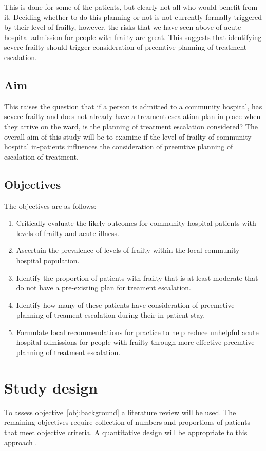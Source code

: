 \documentclass
[
	12pt,
	a4paper,
	oneside,
]{article}
\begin{document}
This is done for some of the patients, but clearly not all who would benefit from it. 
Deciding whether to do this planning or not is not currently formally triggered 
by their level of frailty, however, the risks that we have seen above of acute hospital 
admission for people with frailty are great. This suggests that identifying severe frailty 
should trigger consideration of preemtive planning of treatment escalation.

\subsection{Aim}
This raises the question that if a person is admitted to a community hospital, has 
severe frailty and does not already have a treament escalation plan in place when they 
arrive on the ward, is the planning of treatment escalation considered? The overall 
aim of this study will be to examine if the level of frailty of community hospital
in-patients influences the consideration of preemtive planning of escalation of 
treatment.

\subsection{Objectives}

The objectives are as follows:
\begin{enumerate}
\item	Critically evaluate the likely outcomes for community hospital patients 
		with levels of frailty and acute illness. \label{obj:background}
\item	Ascertain the prevalence of levels of frailty within the local community
		hospital population. \label{obj:prevalence}
\item	Identify the proportion of patients with frailty that is at least moderate
		that do not have a pre-existing plan for treament escalation. \label{obj:noplan}
\item	Identify how many of these patients have consideration of preemetive planning
		of treament escalation during their in-patient stay. \label{obj:association}
\item	Formulate local recommendations for practice to help reduce unhelpful
		acute hospital admissions for people with frailty through more effective
		preemtive planning of treatment escalation.
\end{enumerate}

\section{Study design} \label{sec:design}
To assess objective~\ref{obj:background} a literature review will be used. 
The remaining objectives require collection of numbers
and proportions of patients that meet objective criteria. A quantitative design
will be appropriate to this approach \parencite{parahoo:14}.
\end{document}
